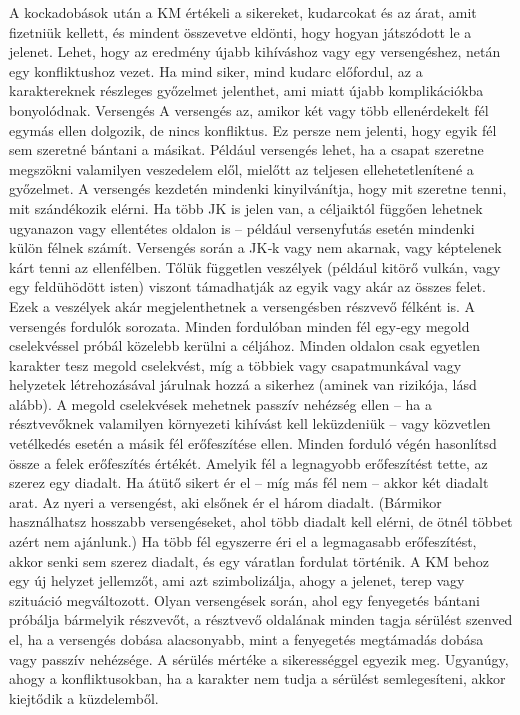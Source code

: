 \documentclass[oneside]{book}
\begin{document}
A kockadobások után a KM értékeli a sikereket, kudarcokat és az árat, amit fizetniük kellett, és mindent összevetve eldönti, hogy hogyan játszódott le a jelenet. Lehet, hogy az eredmény újabb kihíváshoz vagy egy versengéshez, netán egy konfliktushoz vezet. Ha mind siker, mind kudarc előfordul, az a karaktereknek részleges győzelmet jelenthet, ami miatt újabb komplikációkba bonyolódnak.
Versengés
A versengés az, amikor két vagy több ellenérdekelt fél egymás ellen dolgozik, de nincs konfliktus. Ez persze nem jelenti, hogy egyik fél sem szeretné bántani a másikat. Például versengés lehet, ha a csapat szeretne megszökni valamilyen veszedelem elől, mielőtt az teljesen ellehetetlenítené a győzelmet.
A versengés kezdetén mindenki kinyilvánítja, hogy mit szeretne tenni, mit szándékozik elérni. Ha több JK is jelen van, a céljaiktól függően lehetnek ugyanazon vagy ellentétes oldalon is – például versenyfutás esetén mindenki külön félnek számít. Versengés során a JK‑k vagy nem akarnak, vagy képtelenek kárt tenni az ellenfélben. Tőlük független veszélyek (például kitörő vulkán, vagy egy feldühödött isten) viszont támadhatják az egyik vagy akár az összes felet. Ezek a veszélyek akár megjelenthetnek a versengésben részvevő félként is.
A versengés fordulók sorozata. Minden fordulóban minden fél egy‑egy megold cselekvéssel próbál közelebb kerülni a céljához. Minden oldalon csak egyetlen karakter tesz megold cselekvést, míg a többiek vagy csapatmunkával vagy helyzetek létrehozásával járulnak hozzá a sikerhez (aminek van rizikója, lásd alább). A megold cselekvések mehetnek passzív nehézség ellen – ha a résztvevőknek valamilyen környezeti kihívást kell leküzdeniük – vagy közvetlen vetélkedés esetén a másik fél erőfeszítése ellen.
Minden forduló végén hasonlítsd össze a felek erőfeszítés értékét. Amelyik fél a legnagyobb erőfeszítést tette, az szerez egy diadalt. Ha átütő sikert ér el – míg más fél nem – akkor két diadalt arat. Az nyeri a versengést, aki elsőnek ér el három diadalt. (Bármikor használhatsz hosszabb versengéseket, ahol több diadalt kell elérni, de ötnél többet azért nem ajánlunk.)
Ha több fél egyszerre éri el a legmagasabb erőfeszítést, akkor senki sem szerez diadalt, és egy váratlan fordulat történik. A KM behoz egy új helyzet jellemzőt, ami azt szimbolizálja, ahogy a jelenet, terep vagy szituáció megváltozott.
Olyan versengések során, ahol egy fenyegetés bántani próbálja bármelyik részvevőt, a résztvevő oldalának minden tagja sérülést szenved el, ha a versengés dobása alacsonyabb, mint a fenyegetés megtámadás dobása vagy passzív nehézsége. A sérülés mértéke a sikerességgel egyezik meg. Ugyanúgy, ahogy a konfliktusokban, ha a karakter nem tudja a sérülést semlegesíteni, akkor kiejtődik a küzdelemből.
\end{document}
